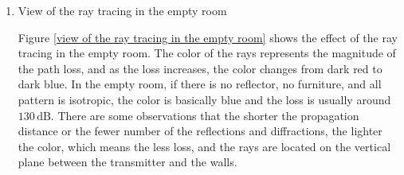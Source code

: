\documentclass[12pt,DIV14,BCOR12mm,a4paper,footinclude=false,headinclude,parskip=half-,twoside,openright,cleardoublepage=empty,toc=index,bibliography=totoc,listof=totoc]{scrreprt}
\numberwithin{equation}{chapter}
\begin{document}
\begin{enumerate}[label=\textbullet]
    \item View of the ray tracing in the empty room
    
    Figure \ref{view of the ray tracing in the empty room} shows the effect of the ray tracing in the empty room. The color of the rays represents the magnitude of the path loss, and as the loss increases, the color changes from dark red to dark blue. In the empty room, if there is no reflector, no furniture, and all pattern is isotropic, the color is basically blue and the loss is usually around $130\,\mathrm{dB}$. There are some observations that the shorter the propagation distance or the fewer number of the reflections and diffractions, the lighter the color, which means the less loss, and the rays are located on the vertical plane between the transmitter and the walls.


\end{enumerate}
\end{document}
